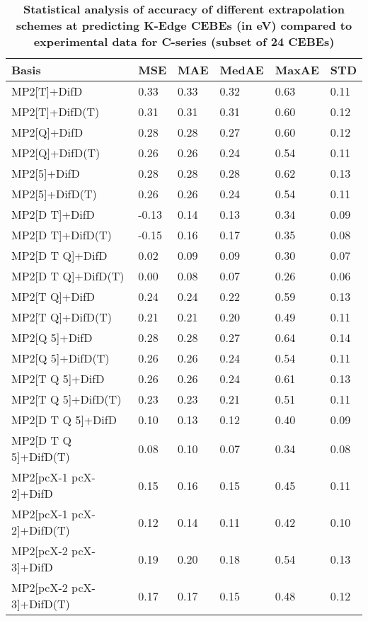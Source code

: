 \begin{table}
  \caption{\textbf{Statistical analysis of accuracy of different extrapolation schemes at predicting K-Edge CEBEs (in eV) compared to experimental data for C-series (subset of 24 CEBEs)}}
  \begin{tabular}{l l l l l l }
    \toprule
    \textbf{Basis} & \textbf{MSE} & \textbf{MAE} & \textbf{MedAE} & \textbf{MaxAE} & \textbf{STD} \\ 
    \midrule
    MP2[T]+DifD & 0.33 & 0.33 & 0.32 & 0.63 & 0.11 \\ 
    MP2[T]+DifD(T) & 0.31 & 0.31 & 0.31 & 0.60 & 0.12 \\ 
    MP2[Q]+DifD & 0.28 & 0.28 & 0.27 & 0.60 & 0.12 \\ 
    MP2[Q]+DifD(T) & 0.26 & 0.26 & 0.24 & 0.54 & 0.11 \\ 
    MP2[5]+DifD & 0.28 & 0.28 & 0.28 & 0.62 & 0.13 \\ 
    MP2[5]+DifD(T) & 0.26 & 0.26 & 0.24 & 0.54 & 0.11 \\ 
    MP2[D T]+DifD & -0.13 & 0.14 & 0.13 & 0.34 & 0.09 \\ 
    MP2[D T]+DifD(T) & -0.15 & 0.16 & 0.17 & 0.35 & 0.08 \\ 
    MP2[D T Q]+DifD & 0.02 & 0.09 & 0.09 & 0.30 & 0.07 \\ 
    MP2[D T Q]+DifD(T) & 0.00 & 0.08 & 0.07 & 0.26 & 0.06 \\ 
    MP2[T Q]+DifD & 0.24 & 0.24 & 0.22 & 0.59 & 0.13 \\ 
    MP2[T Q]+DifD(T) & 0.21 & 0.21 & 0.20 & 0.49 & 0.11 \\ 
    MP2[Q 5]+DifD & 0.28 & 0.28 & 0.27 & 0.64 & 0.14 \\ 
    MP2[Q 5]+DifD(T) & 0.26 & 0.26 & 0.24 & 0.54 & 0.11 \\ 
    MP2[T Q 5]+DifD & 0.26 & 0.26 & 0.24 & 0.61 & 0.13 \\ 
    MP2[T Q 5]+DifD(T) & 0.23 & 0.23 & 0.21 & 0.51 & 0.11 \\ 
    MP2[D T Q 5]+DifD & 0.10 & 0.13 & 0.12 & 0.40 & 0.09 \\ 
    MP2[D T Q 5]+DifD(T) & 0.08 & 0.10 & 0.07 & 0.34 & 0.08 \\ 
    MP2[pcX-1 pcX-2]+DifD & 0.15 & 0.16 & 0.15 & 0.45 & 0.11 \\ 
    MP2[pcX-1 pcX-2]+DifD(T) & 0.12 & 0.14 & 0.11 & 0.42 & 0.10 \\ 
    MP2[pcX-2 pcX-3]+DifD & 0.19 & 0.20 & 0.18 & 0.54 & 0.13 \\ 
    MP2[pcX-2 pcX-3]+DifD(T) & 0.17 & 0.17 & 0.15 & 0.48 & 0.12 \\ 

\end{tabular}
\end{table}
